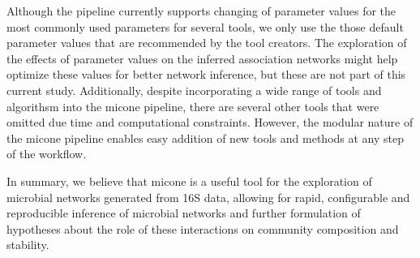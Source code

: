   Although the pipeline currently supports changing of parameter values for the most commonly used parameters for several tools, we only use the those default parameter values that are recommended by the tool creators.
  The exploration of the effects of parameter values on the inferred association networks might help optimize these values for better network inference, but these are not part of this current study.
  Additionally, despite incorporating a wide range of tools and algorithsm into the \ac{micone} pipeline, there are several other tools that were omitted due time and computational constraints.
  However, the modular nature of the \ac{micone} pipeline enables easy addition of new tools and methods at any step of the workflow.


  In summary, we believe that \ac{micone} is a useful tool for the exploration of microbial networks generated from 16S data, allowing for rapid, configurable and reproducible inference of microbial networks and further formulation of hypotheses about the role of these interactions on community composition and stability.
